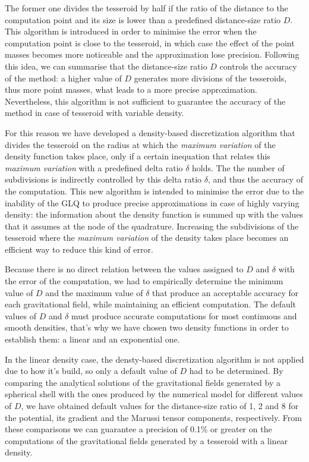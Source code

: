 \documentclass[extra]{gji}
\begin{document}
The former one divides the tesseroid by half if the ratio of the distance to 
the computation point and its size is lower than a predefined distance-size 
ratio $D$.
This algorithm is introduced in order to minimise the error when the 
computation point is close to the tesseroid, in which case the effect of the 
point masses becomes more noticeable and the approximation lose precision.
Following this idea, we can summarise that the distance-size ratio $D$ 
controls the accuracy of the method: a higher value of $D$ generates more 
divisions of the tesseroids, thus more point masses, what leads to a more 
precise approximation.
Nevertheless, this algorithm is not sufficient to guarantee the accuracy of 
the method in case of tesseroid with variable density.

For this reason we have developed a density-based discretization algorithm that 
divides the tesseroid on the radius at which the \emph{maximum variation} of 
the density function takes place, only if a certain inequation that relates 
this \emph{maximum variation} with a predefined delta ratio $\delta$ holds.
The the number of subdivisions is indirectly controlled by this delta 
ratio $\delta$, and thus the accuracy of the computation.
This new algorithm is intended to minimise the error due to the inability of 
the GLQ to produce precise approximations in case of highly varying density: 
the information about the density function is summed up with the values that 
it assumes at the node of the quadrature.
Increasing the subdivisions of the tesseroid where the \emph{maximum 
variation} of the density takes place becomes an efficient way to reduce this 
kind of error.

Because there is no direct relation between the values assigned to $D$ and 
$\delta$ with the error of the computation, we had to empirically determine 
the minimum value of $D$ and the maximum value of $\delta$ that produce an 
acceptable accuracy for each gravitational field, while maintaining an 
efficient computation.
The default values of $D$ and $\delta$ must produce accurate computations for 
most continuous and smooth densities, that's why we have chosen two density 
functions in order to establish them: a linear and an exponential one.

In the linear density case, the densty-based discretization algorithm is not 
applied due to how it's build, so only a default value of $D$ had to be 
determined.
By comparing the analytical solutions of the gravitational fields generated by 
a spherical shell with the ones produced by the numerical model for different 
values of $D$, we have obtained default values for the distance-size ratio of 
1, 2 and 8 for the potential, its gradient and the Marussi tensor components, 
respectively.
From these comparisons we can guarantee a precision of 0.1\% or greater on the 
computations of the gravitational fields generated by a tesseroid with a 
linear density.
\end{document}
